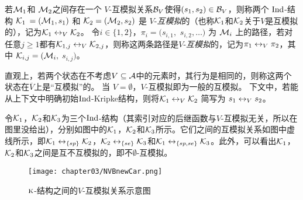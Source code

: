 若${\cal M}_1$和 ${\cal M}_2$之间存在一个 $V$-互模拟关系${\cal B}_V$使得$(s_1, s_2)\in {\cal B}_V$，则称两个 $\textrm{Ind}$-结构 ${\cal K}_1$ $= ({\cal M}_1, s_1)$ 和 ${\cal K}_2 = ({\cal M}_2, s_2)$ 是 $V$-{\em 互模拟}的（也称${\cal K}_1$和${\cal K}_2$关于$V$是互模拟的），记为${\cal K}_1 \leftrightarrow_V {\cal K}_2$。
令$i\in \{1,2\}$，$\pi_i=(s_{i,1},$ $s_{i,2},\ldots)$ 为 ${\cal M}_i$ 上的路径，若对任意$j \ge 1$都有$ {\cal K}_{1,j} \leftrightarrow_V {\cal K}_{2,j}$，则称这两条路径是$V$-{\em 互模拟}的，记为$\pi_1 \leftrightarrow_V \pi_2$，其中 ${\cal K}_{i,j}=({\cal M}_i,$ $s_{i,j})$。


直观上，若两个状态在不考虑$V\subseteq\cal A$中的元素时，其行为是相同的，则称这两个状态在$\overline{V}$上是“互模拟”的。
当 $V=\emptyset$，$V$-互模拟即为一般的互模拟。
下文中，若能从上下文中明确初始$\textrm{Ind}$-Kripke结构，则将${\cal K}_1 \leftrightarrow_V {\cal K}_2$ 简写为 $s_1 \leftrightarrow_V s_2$。

\begin{example}\label{exam:vB}
	令${\cal K}_1$，${\cal K}_2$和${\cal K}_3$为三个$\textrm{Ind}$-结构（其索引对应的后继函数与$V$-互模拟无关，所以在图里没给出），分别如图中的${\cal K}_1$，${\cal K}_2$和${\cal K}_3$所示。它们之间的互模拟关系如图中虚线所示，即${\cal K}_1 \leftrightarrow_{\{sp\}} {\cal K}_2$，${\cal K}_2 \leftrightarrow_{\{se\}} {\cal K}_3$和${\cal K}_1 \leftrightarrow_{\{sp,se\}} {\cal K}_3$。此外，可以看出${\cal K}_1$，${\cal K}_2$和${\cal K}_3$之间是互不互模拟\cite{Baier:PMC:2008}的，即不$\emptyset$-互模拟。
	\begin{figure*}[!htb]
		\centering
		\texttt{[image: chapter03/NVBnewCar.png]}\\
		\caption{$\textsc{k}$-结构之间的$V$-互模拟关系示意图}
		\label{Fig:chapter04:v1uv2}
	\end{figure*}
\end{example}



